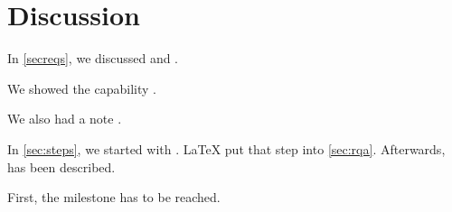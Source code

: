 \documentclass{article}
\begin{document}
\section{Discussion}
In \cref{secreqs}, we discussed  and .

We showed the capability .

We also had a note .

In \cref{sec:steps}, we started with .
\LaTeX{} put that step into \cref{sec:rqa}.
Afterwards,  has been described.

First, the milestone  has to be reached.
\end{document}
